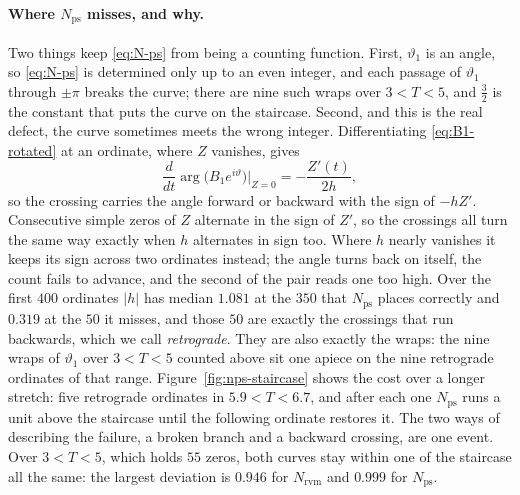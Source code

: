 \documentclass[11pt]{article}
\theoremstyle{definition}
\begin{document}
\paragraph{Where $N_{\mathrm{ps}}$ misses, and why.} Two things keep
\eqref{eq:N-ps} from being a counting function. First, $\vartheta_1$ is an
angle, so \eqref{eq:N-ps} is determined only up to an even integer, and each
passage of $\vartheta_1$ through $\pm\pi$ breaks the curve; there are nine such
wraps over $3<T<5$, and $\tfrac32$ is the constant that puts the curve on the
staircase. Second, and this is the real defect, the curve sometimes meets the
wrong integer. Differentiating \eqref{eq:B1-rotated} at an ordinate, where $Z$
vanishes, gives
\begin{equation}\label{eq:crossing-rate}
\frac{d}{dt}\arg\bigl(B_1e^{i\vartheta}\bigr)\bigg|_{Z=0}=-\frac{Z'(t)}{2h},
\end{equation}
so the crossing carries the angle forward or backward with the sign of $-hZ'$.
Consecutive simple zeros of $Z$ alternate in the sign of $Z'$, so the crossings
all turn the same way exactly when $h$ alternates in sign too. Where $h$ nearly
vanishes it keeps its sign across two ordinates instead; the angle turns back on
itself, the count fails to advance, and the second of the pair reads one too
high. Over the first $400$ ordinates $|h|$ has median $1.081$ at the $350$ that
$N_{\mathrm{ps}}$ places correctly and $0.319$ at the $50$ it misses, and those
$50$ are exactly the crossings that run backwards, which we call
\emph{retrograde}. They are also exactly the
wraps: the nine wraps of $\vartheta_1$ over $3<T<5$ counted above sit one apiece
on the nine retrograde ordinates of that range. Figure~\ref{fig:nps-staircase}
shows the cost over a longer stretch: five retrograde ordinates in
$5.9<T<6.7$, and after each one $N_{\mathrm{ps}}$ runs a unit above the
staircase until the following ordinate restores it. The two ways of describing the
failure, a broken branch and a backward crossing, are one event. Over $3<T<5$, which holds
$55$ zeros, both curves stay within one of the staircase all the same: the
largest deviation is $0.946$ for $N_{\mathrm{rvm}}$ and $0.999$ for
$N_{\mathrm{ps}}$.
\end{document}
